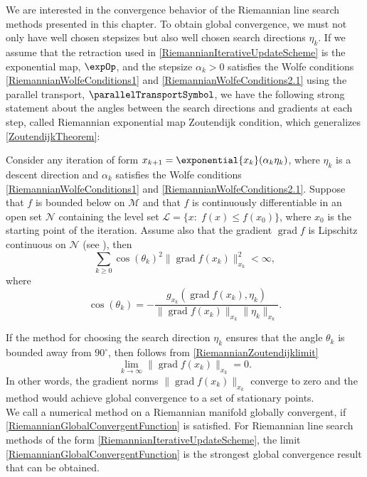We are interested in the convergence behavior of the Riemannian line search methods presented in this chapter. To obtain global convergence, we must not only have well chosen stepsizes but also well chosen search directions $\eta_k$. If we assume that the retraction used in \cref{RiemannianIterativeUpdateScheme} is the exponential map, $\expOp$, and the stepsize $\alpha_k > 0$ satisfies the Wolfe conditions \cref{RiemannianWolfeConditions1} and \cref{RiemannianWolfeConditions2.1} using the parallel transport, $\parallelTransportSymbol$, we have the following strong statement about the angles between the search directions and gradients at each step, called Riemannian exponential map Zoutendijk condition, which generalizes \cref{ZoutendijkTheorem}:

\begin{theorem}[{\cite[Theorem~2.4.1]{Qi:2011}}] \label{RiemannianZoutendijkCondition}
    Consider any iteration of form $x_{k+1} = \exponential{x_k}(\alpha_k \eta_k)$, where $\eta_k$ is a descent direction and $\alpha_k$ satisfies the Wolfe conditions \cref{RiemannianWolfeConditions1} and \cref{RiemannianWolfeConditions2.1}. Suppose that $f$ is bounded below on $\mathcal{M}$ and that $f$ is continuously differentiable in an open set $\mathcal{N}$ containing the level set $\mathcal{L} = \{ x \colon \; f(x) \leq f(x_0)\}$, where $x_0$ is the starting point of the iteration. Assume also that the gradient $\operatorname{grad} f$ is Lipschitz continuous on $\mathcal{N}$ (see \cite[Theorem 2.4.1]{Qi:2011}), then
    \begin{equation}\label{RiemannianZoutendijklimit}
        \sum_{k \geq 0} \cos(\theta_k)^2 \lVert \operatorname{grad} f(x_k) \rVert^2_{x_k} < \infty,
    \end{equation}
    where
    \begin{equation*}
        \cos(\theta_k) = - \frac{g_{x_k}(\operatorname{grad} f(x_k), \eta_k)}{\lVert \operatorname{grad} f(x_k) \rVert_{x_k} \lVert \eta_k \rVert_{x_k}}.
    \end{equation*}    
\end{theorem}

If the method for choosing the search direction $\eta_k$ ensures that the angle $\theta_k$ is bounded away from $90^{\circ}$, then follows from \cref{RiemannianZoutendijklimit} 
\begin{equation}\label{RiemannianGlobalConvergentFunction}
    \lim\limits_{k \to \infty} \lVert \operatorname{grad} f(x_k) \rVert_{x_k} = 0.
\end{equation}
In other words, the gradient norms $\lVert \operatorname{grad} f(x_k) \rVert_{x_k}$ converge to zero and the method would achieve global convergence to a set of stationary points. \\
We call a numerical method on a Riemannian manifold globally convergent, if \cref{RiemannianGlobalConvergentFunction} is satisfied. For Riemannian line search methods of the form \cref{RiemannianIterativeUpdateScheme}, the limit \cref{RiemannianGlobalConvergentFunction} is the strongest global convergence result that can be obtained. \\

